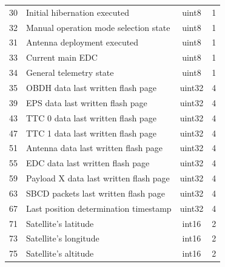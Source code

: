 \begin{table}[!ht]
\begin{tabular}{clcc}
		30                  & Initial hibernation executed                  & uint8              & 1                     \\
		32                  & Manual operation mode selection state         & uint8              & 1                     \\
		31                  & Antenna deployment executed                   & uint8              & 1                     \\
		33                  & Current main EDC                              & uint8              & 1                     \\
		34                  & General telemetry state                       & uint8              & 1                     \\   
		35                  & OBDH data last written flash page             & uint32             & 4                     \\   
		39                  & EPS data last written flash page              & uint32             & 4                     \\   
		43                  & TTC 0 data last written flash page            & uint32             & 4                     \\   
		47                  & TTC 1 data last written flash page            & uint32             & 4                     \\   
		51                  & Antenna data last written flash page          & uint32             & 4                     \\   
		55                  & EDC data last written flash page              & uint32             & 4                     \\   
		59                  & Payload X data last written flash page        & uint32             & 4                     \\   
		63                  & SBCD packets last written flash page          & uint32             & 4                     \\   
		67                  & Last position determination timestamp         & uint32             & 4                     \\   
		71                  & Satellite's latitude                          & int16              & 2                     \\   
		73                  & Satellite's longitude                         & int16              & 2                     \\   
		75                  & Satellite's altitude                          & int16              & 2                     \\   

\end{tabular}
\end{table}
